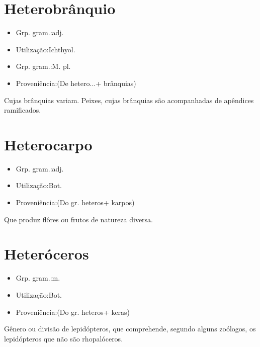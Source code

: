 \documentclass{article}
\begin{document}
\section{Heterobrânquio}
\begin{itemize}
\item {Grp. gram.:adj.}
\end{itemize}
\begin{itemize}
\item {Utilização:Ichthyol.}
\end{itemize}
\begin{itemize}
\item {Grp. gram.:M. pl.}
\end{itemize}
\begin{itemize}
\item {Proveniência:(De \textunderscore hetero...\textunderscore  + \textunderscore brânquias\textunderscore )}
\end{itemize}
Cujas brânquias variam.
Peixes, cujas brânquias são acompanhadas de apêndices ramificados.
\section{Heterocarpo}
\begin{itemize}
\item {Grp. gram.:adj.}
\end{itemize}
\begin{itemize}
\item {Utilização:Bot.}
\end{itemize}
\begin{itemize}
\item {Proveniência:(Do gr. \textunderscore heteros\textunderscore  + \textunderscore karpos\textunderscore )}
\end{itemize}
Que produz flôres ou frutos de natureza diversa.
\section{Heteróceros}
\begin{itemize}
\item {Grp. gram.:m.}
\end{itemize}
\begin{itemize}
\item {Utilização:Bot.}
\end{itemize}
\begin{itemize}
\item {Proveniência:(Do gr. \textunderscore heteros\textunderscore  + \textunderscore keras\textunderscore )}
\end{itemize}
Gênero ou divisão de lepidópteros, que comprehende, segundo alguns zoólogos, os lepidópteros que não são rhopalóceros.
\end{document}

